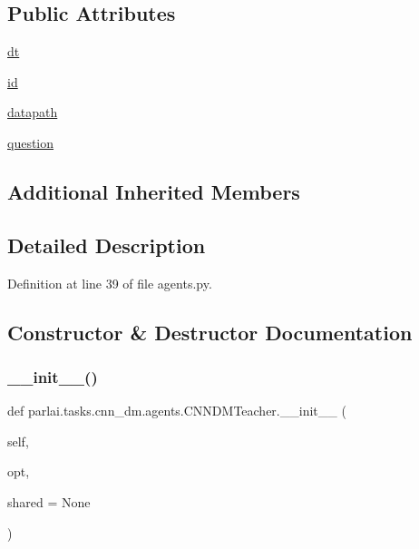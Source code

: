\subsection*{Public Attributes}
\begin{DoxyCompactItemize}
\item 
\hyperlink{classparlai_1_1tasks_1_1cnn__dm_1_1agents_1_1CNNDMTeacher_a53c9a947f820813c147c427ee932110b}{dt}
\item 
\hyperlink{classparlai_1_1tasks_1_1cnn__dm_1_1agents_1_1CNNDMTeacher_a0057b9cfef0a8a164db0b795980c41e1}{id}
\item 
\hyperlink{classparlai_1_1tasks_1_1cnn__dm_1_1agents_1_1CNNDMTeacher_ac5bd6f991445d012def0d4891084ed06}{datapath}
\item 
\hyperlink{classparlai_1_1tasks_1_1cnn__dm_1_1agents_1_1CNNDMTeacher_adabc9a81947bb5e85f132fc7676958e6}{question}
\end{DoxyCompactItemize}
\subsection*{Additional Inherited Members}


\subsection{Detailed Description}


Definition at line 39 of file agents.\+py.



\subsection{Constructor \& Destructor Documentation}
\mbox{\label{classparlai_1_1tasks_1_1cnn__dm_1_1agents_1_1CNNDMTeacher_a2a874e26d57c9f9c399a757f670f9133}} 
\subsubsection{\texorpdfstring{\+\_\+\+\_\+init\+\_\+\+\_\+()}{\_\_init\_\_()}}
{\footnotesize\ttfamily def parlai.\+tasks.\+cnn\+\_\+dm.\+agents.\+C\+N\+N\+D\+M\+Teacher.\+\_\+\+\_\+init\+\_\+\+\_\+ (\begin{DoxyParamCaption}\item[{}]{self,  }\item[{}]{opt,  }\item[{}]{shared = {\ttfamily None} }\end{DoxyParamCaption})}



